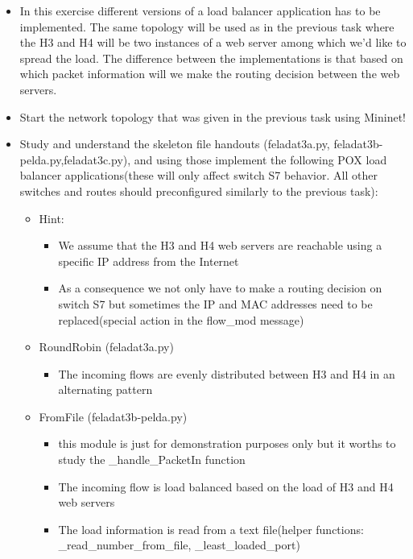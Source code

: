 \documentclass[a4paper]{article}
\begin{document}
\begin{itemize}
\item In this exercise different versions of a load balancer application has to be implemented. The same topology will be used as in the previous task where
the H3 and H4 will be two instances of a web server among which we'd like to spread the load. The difference between the implementations is that
based on which  packet information will we make the routing decision between the web servers.

\item    Start the network topology that was given in the previous task using Mininet!

\item    Study and understand the skeleton file handouts (feladat3a.py, feladat3b-pelda.py,feladat3c.py), and using those implement the following POX
load balancer applications(these will only affect switch S7 behavior. All other switches and routes should preconfigured similarly to the previous task):
\begin{itemize}
\item        Hint:
\begin{itemize}
\item            We assume that the H3 and H4 web servers are reachable using a specific IP address from the Internet
\item            As a consequence we not only have to make a routing decision on switch S7 but sometimes the IP and MAC addresses need to be replaced(special action in the flow\_mod message) 
\end{itemize}
\item        RoundRobin (feladat3a.py)
\begin{itemize}
\item            The incoming flows are evenly distributed between H3 and H4 in an alternating pattern
\end{itemize}
\item        FromFile (feladat3b-pelda.py)
\begin{itemize}
\item            this module is just for demonstration purposes only but it worths to study the \_handle\_PacketIn function
\item            The incoming flow is load balanced based on the load of H3 and H4 web servers
\item            The load information is read from a text file(helper functions: \_read\_number\_from\_file, \_least\_loaded\_port) 

\end{itemize}
\end{itemize}
\end{itemize}
\end{document}
